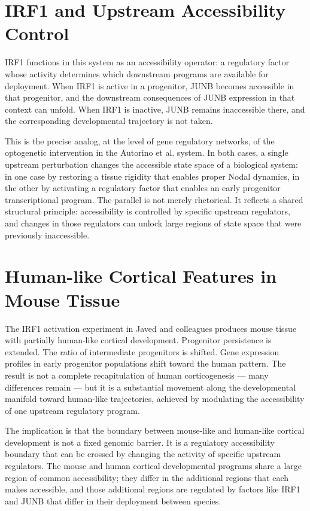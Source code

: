 \documentclass[12pt, a4paper, openany]{book}
\theoremstyle{definition}
\theoremstyle{remark}
\begin{document}
\section{IRF1 and Upstream Accessibility Control}

IRF1 functions in this system as an accessibility operator: a regulatory factor whose activity determines which downstream programs are available for deployment. When IRF1 is active in a progenitor, JUNB becomes accessible in that progenitor, and the downstream consequences of JUNB expression in that context can unfold. When IRF1 is inactive, JUNB remains inaccessible there, and the corresponding developmental trajectory is not taken.

This is the precise analog, at the level of gene regulatory networks, of the optogenetic intervention in the Autorino et al. system. In both cases, a single upstream perturbation changes the accessible state space of a biological system: in one case by restoring a tissue rigidity that enables proper Nodal dynamics, in the other by activating a regulatory factor that enables an early progenitor transcriptional program. The parallel is not merely rhetorical. It reflects a shared structural principle: accessibility is controlled by specific upstream regulators, and changes in those regulators can unlock large regions of state space that were previously inaccessible.

\section{Human-like Cortical Features in Mouse Tissue}

The IRF1 activation experiment in Javed and colleagues produces mouse tissue with partially human-like cortical development. Progenitor persistence is extended. The ratio of intermediate progenitors is shifted. Gene expression profiles in early progenitor populations shift toward the human pattern. The result is not a complete recapitulation of human corticogenesis — many differences remain — but it is a substantial movement along the developmental manifold toward human-like trajectories, achieved by modulating the accessibility of one upstream regulatory program.

The implication is that the boundary between mouse-like and human-like cortical development is not a fixed genomic barrier. It is a regulatory accessibility boundary that can be crossed by changing the activity of specific upstream regulators. The mouse and human cortical developmental programs share a large region of common accessibility; they differ in the additional regions that each makes accessible, and those additional regions are regulated by factors like IRF1 and JUNB that differ in their deployment between species.
\end{document}
